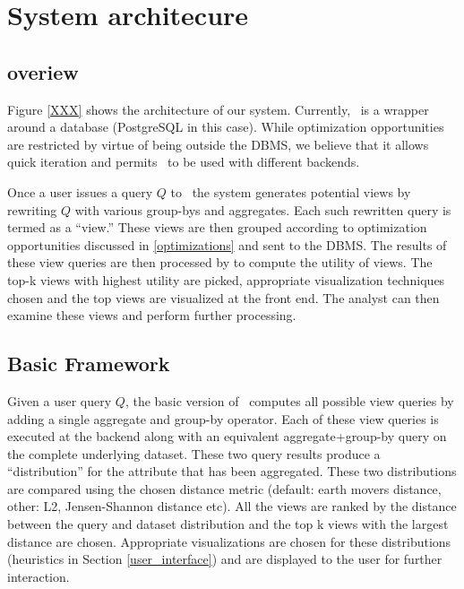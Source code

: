 \section{System architecure}

\subsection{\SeeDB overiew}
\label{overview}

Figure \ref{XXX} shows the architecture of our system. Currently, \SeeDB\ is a
wrapper around a database (PostgreSQL in this case). While optimization
opportunities are restricted by virtue of being outside the DBMS, we believe
that it allows quick iteration and permits \SeeDB\ to be used with different
backends. 

Once a user issues a query $Q$ to \SeeDB\, the system generates potential views
by rewriting $Q$ with various group-bys and aggregates. Each such rewritten
query is termed as a ``view.'' These views are then grouped according to
optimization opportunities discussed in \ref{optimizations} and sent to the
DBMS. The results of these view queries are then processed by \SeeDB to compute
the utility of views. The top-k views with highest utility are picked,
appropriate visualization techniques chosen and the top views are visualized at
the \SeeDB front end. The analyst can then examine these views and perform
further processing.

\subsection{Basic Framework}
\label{basic_framework}

Given a user query $Q$, the basic version of \SeeDB\ computes all possible view
queries by adding a single aggregate and group-by operator. Each of these view
queries is executed at the backend along with an equivalent aggregate+group-by
query on the complete underlying dataset. These two query results produce a
``distribution'' for the attribute that has been aggregated. These two
distributions are compared using the chosen distance metric (default: earth
movers distance, other: L2, Jensen-Shannon distance etc). All the views are
ranked by the distance between the query and dataset distribution and the
top k views with the largest distance are chosen. Appropriate visualizations are
chosen for these distributions (heuristics in Section \ref{user_interface}) and
are displayed to the user for further interaction.

